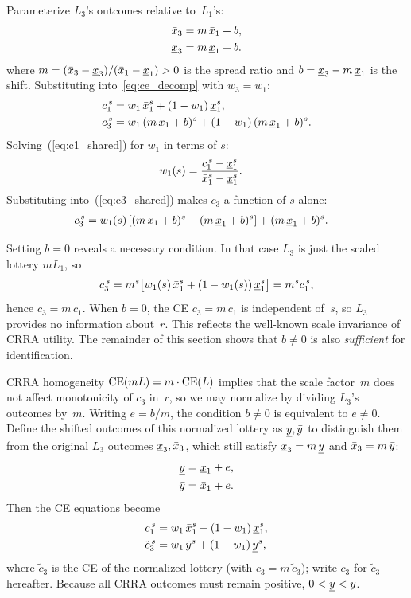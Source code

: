 Parameterize $L_3$'s outcomes relative to~$L_1$'s:
\begin{equation}\label{eq:affine}
  \begin{aligned}
    \bar{x}_3 &= m\,\bar{x}_1 + b, \\
    \underline{x}_3 &= m\,\underline{x}_1 + b.
  \end{aligned}
\end{equation}
where $m = (\bar{x}_3 - \underline{x}_3)/(\bar{x}_1 - \underline{x}_1) > 0$ is the spread ratio
and $b = \underline{x}_3 - m\,\underline{x}_1$ is the shift.
Substituting into~\eqref{eq:ce_decomp} with $w_3 = w_1$:
\begin{align}
    c_1^{\,s} &= w_1\, \bar{x}_1^s + (1-w_1)\, \underline{x}_1^s,
    \label{eq:c1_shared} \\
    c_3^{\,s} &= w_1\, (m\,\bar{x}_1 + b)^s + (1-w_1)\, (m\,\underline{x}_1 + b)^s.
    \label{eq:c3_shared}
\end{align}
Solving~(\ref{eq:c1_shared}) for $w_1$ in terms of $s$:
\begin{align}
  \label{eq:solved_w1}
  w_1(s) &= \frac{c_1^{\,s} - \underline{x}_1^s}{\bar{x}_1^s - \underline{x}_1^s}.
\end{align}
Substituting into~(\ref{eq:c3_shared}) makes $c_3$ a function of $s$ alone:
\begin{align}
  \label{eq:c3_wr}
  c_3^{\,s} &= w_1(s) \left[ (m\,\bar{x}_1 + b)^s - (m\,\underline{x}_1 + b)^s\right] + (m\,\underline{x}_1 + b)^s.
\end{align}

Setting $b = 0$ reveals a necessary condition. In that case $L_3$ is just the
scaled lottery $mL_1$, so
\begin{equation}
  c_3^{\,s}
  = m^s \bigl[w_1(s)\,\bar{x}_1^s + (1-w_1(s))\,\underline{x}_1^s\bigr]
  = m^s c_1^{\,s},
\end{equation}
hence $c_3 = m\,c_1$.
When $b = 0$, the CE $c_3 = m\,c_1$ is independent of~$s$, so $L_3$ provides
no information about~$r$. This reflects the well-known scale invariance of
CRRA utility. The remainder of this section shows that $b \neq 0$ is also
\textit{sufficient} for identification.

CRRA homogeneity $\operatorname{CE}(mL) = m \cdot \operatorname{CE}(L)$ implies that the scale
factor~$m$ does not affect monotonicity of $c_3$ in~$r$, so we may
normalize by dividing $L_3$'s outcomes by~$m$. Writing $e = b/m$, the
condition $b \neq 0$ is equivalent to $e \neq 0$. Define the shifted outcomes
of this normalized lottery as $\underline{y},\bar{y}$ to distinguish them from the
original $L_3$ outcomes $\underline{x}_3,\bar{x}_3$, which still satisfy
$\underline{x}_3 = m\,\underline{y}$ and $\bar{x}_3 = m\,\bar{y}$:
\[
  \begin{aligned}
    \underline{y} &= \underline{x}_1 + e, \\
    \bar{y} &= \bar{x}_1 + e.
  \end{aligned}
\]
Then the CE equations become
\begin{align}
    c_1^{\,s} &= w_1\, \bar{x}_1^s + (1-w_1)\, \underline{x}_1^s,
    \label{eq:c1_shift} \\
    \tilde{c}_3^{\,s} &= w_1\, \bar{y}^s
      + (1-w_1)\, \underline{y}^s,
    \label{eq:c3_shift}
\end{align}
where $\tilde{c}_3$ is the CE of the normalized lottery (with
$c_3 = m\,\tilde{c}_3$); write $c_3$ for $\tilde{c}_3$ hereafter.
Because all CRRA outcomes must remain positive, $0 < \underline{y} < \bar{y}$.

